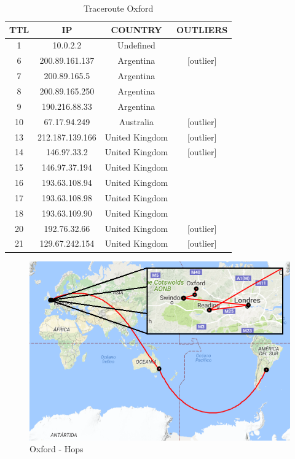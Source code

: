 \begin{table}[!htbp]
\centering
\caption{Traceroute Oxford}
\label{traceroute-oxford}
\begin{tabular}{|c|c|c|c|}
\hline
\textbf{TTL} & \textbf{IP}       & \textbf{COUNTRY} & \textbf{OUTLIERS} \\ \hline
1            & 10.0.2.2          & Undefined        & 			       \\ \hline
6            & 200.89.161.137    & Argentina        & {[}outlier{]}     \\ \hline
7            & 200.89.165.5      & Argentina        &                   \\ \hline
8            & 200.89.165.250    & Argentina        &                   \\ \hline
9            & 190.216.88.33     & Argentina        &                   \\ \hline
10           & 67.17.94.249      & Australia        & {[}outlier{]}     \\ \hline
13           & 212.187.139.166   & United Kingdom   & {[}outlier{]}     \\ \hline
14           & 146.97.33.2       & United Kingdom   & {[}outlier{]}     \\ \hline
15           & 146.97.37.194     & United Kingdom   &                   \\ \hline
16           & 193.63.108.94     & United Kingdom   &                   \\ \hline
17           & 193.63.108.98     & United Kingdom   &                   \\ \hline
18           & 193.63.109.90     & United Kingdom   &                   \\ \hline
20           & 192.76.32.66      & United Kingdom   & {[}outlier{]}     \\ \hline
21           & 129.67.242.154    & United Kingdom   & {[}outlier{]}     \\ \hline
\end{tabular}
\end{table}

\begin{figure}[!htbp]
  \centering
    \includegraphics[scale=0.8]{imagenes/oxford-graficos/mapa-oxford.png}
  \caption{Oxford - Hops}
  \label{mapa-oxford}
\end{figure}

